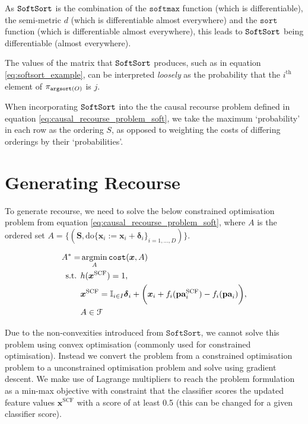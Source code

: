 As $\operatorname*{\texttt{SoftSort}}$ is the combination of the $\texttt{softmax}$ function (which is differentiable), the semi-metric $d$ (which is differentiable almost everywhere) and the $\texttt{sort}$ function (which is differentiable almost everywhere), this leads to $\operatorname*{\texttt{SoftSort}}$ being differentiable (almost everywhere).

The values of the matrix that $\operatorname*{\texttt{SoftSort}}$ produces, such as in equation \ref{eq:softsort_example}, can be interpreted \textit{loosely} as the probability that the $i^{\text{th}}$ element of $\pi_{\operatorname*{\texttt{argsort}}(O)}$ is $j$.

When incorporating $\operatorname*{\texttt{SoftSort}}$ into the the causal recourse problem defined in equation \ref{eq:causal_recourse_problem_soft}, we take the maximum `probability' in each row as the ordering $S$, as opposed to weighting the costs of differing orderings by their `probabilities'.

\section{Generating Recourse} \label{section:generating_recourse}

To generate recourse, we need to solve the below constrained optimisation problem from equation \ref{eq:causal_recourse_problem_soft}, where $A$ is the ordered set $A = \big\{(\mathbf{S}, \text{do} \{\boldsymbol{x}_i:=\boldsymbol{x}_i + \boldsymbol{\delta}_i\}_{i=1, \ldots, D})\big\}$.

\begin{align}
	A^* = & \operatorname*{argmin}_{A} \texttt{cost}(\boldsymbol{x}, A) \\ \nonumber
	\text{s.t. } & h(\boldsymbol{x}^{\text{SCF}}) = 1, \\ \nonumber
	& 	\boldsymbol{x}^{\text{SCF}} = \mathbb{I}_{i \in I} \boldsymbol{\delta}_i + \bigg( \boldsymbol{x}_i + f_i(\textbf{pa}^{\text{SCF}}_i) - f_i(\textbf{pa}_i) \bigg), \\ \nonumber
	& A \in \mathcal{F}
\end{align} 

Due to the non-convexities introduced from $\texttt{SoftSort}$, we cannot solve this problem using convex optimisation (commonly used for constrained optimisation). Instead we convert the problem from a constrained optimisation problem to a unconstrained optimisation problem and solve using gradient descent. We make use of Lagrange multipliers to reach the problem formulation as a min-max objective with constraint that the classifier scores the updated feature values $\boldsymbol{x}^{\text{SCF}}$ with a score of at least 0.5 (this can be changed for a given classifier score).

